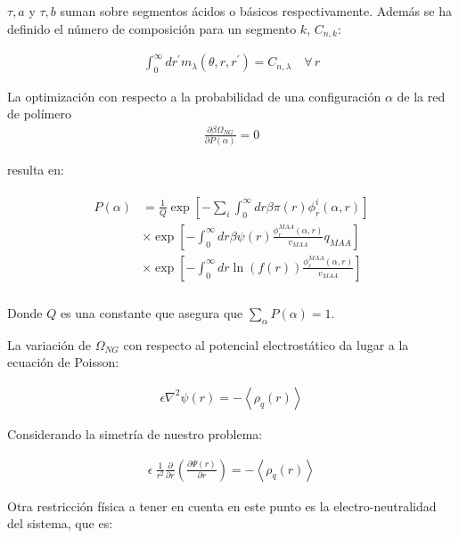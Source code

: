 \noindent $\tau,a$ y  $\tau,b$ suman sobre segmentos \'acidos o b\'asicos respectivamente. Adem\'as se ha definido el n\'umero de composici\'on para un segmento $k$, $C_{n,k}$:

	\begin{align}
		\int_0^\infty dr^\prime  m_\lambda(\theta,r,r^\prime) = C_{n,\lambda}\quad \forall \, r
		\label{eq:esf:composition}
	\end{align}

La optimizaci\'on con respecto a la probabilidad de una configuraci\'on $\alpha$ de la red de pol\'imero
\begin{align}
	\frac{\partial \beta\Omega_{NG}}{\partial P(\alpha)} = 0
\end{align}

 resulta en:

\begin{align}
	\begin{aligned}
		P(\alpha)&=\frac{1}{Q}\exp\left[- \sum_i{\int_0^\infty{dr\beta\pi(r)\phi^i_r(\alpha,r)}}\right] \\
		& \times \exp \left[ -\int_0^\infty dr \beta \psi(r)\frac{\phi^{MAA}_r(\alpha,r)}{v_{MAA}} q_{MAA}  \right] \\
		& \times \exp\left[ -\int_0^\infty{ dr\ln(f(r))\frac{\phi^{MAA}_r(\alpha,r)}{v_{MAA}}}\right] \\
	\end{aligned}
	\label{eq:esf:proba-alfa}
\end{align}

\noindent Donde $Q$ es una constante que asegura que $\sum_\alpha P(\alpha) = 1$.


La variaci\'on de $\Omega_{NG}$ con respecto al potencial electrost\'atico da lugar a la ecuaci\'on de Poisson:

\begin{align}
	\epsilon\nabla^2\psi(r) = -\left<\rho_q(r)\right>
\end{align}

Considerando la simetr\'ia de nuestro problema:

\begin{align}
	\epsilon ~ \frac{1}{r^2} \frac{\partial}{\partial r}\left(\frac{\partial \Psi(r)}{\partial r}\right) = -\left<\rho_q(r)\right>
	\label{eq:esf:poisson}
\end{align}

Otra restricci\'on f\'isica a tener en cuenta en este punto es la electro-neutralidad del sistema, que es:

